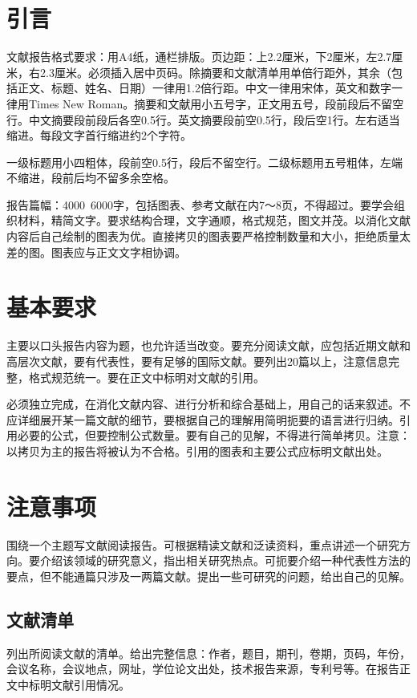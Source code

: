 
\section{引言}
    文献报告格式要求：用A4纸，通栏排版。页边距：上2.2厘米，下2厘米，左2.7厘米，右2.3厘米。必须插入居中页码。除摘要和文献清单用单倍行距外，其余（包括正文、标题、姓名、日期）一律用1.2倍行距。中文一律用宋体，英文和数字一律用Times New Roman。摘要和文献用小五号字，正文用五号，段前段后不留空行。中文摘要段前段后各空0.5行。英文摘要段前空0.5行，段后空1行。左右适当缩进。每段文字首行缩进约2个字符。

    一级标题用小四粗体，段前空0.5行，段后不留空行。二级标题用五号粗体，左端不缩进，段前后均不留多余空格。

    报告篇幅：4000~6000字，包括图表、参考文献在内7～8页，不得超过。要学会组织材料，精简文字。要求结构合理，文字通顺，格式规范，图文并茂。以消化文献内容后自己绘制的图表为优。直接拷贝的图表要严格控制数量和大小，拒绝质量太差的图。图表应与正文文字相协调。

\section{基本要求}
    主要以口头报告内容为题，也允许适当改变。要充分阅读文献，应包括近期文献和高层次文献，要有代表性，要有足够的国际文献。要列出20篇以上，注意信息完整，格式规范统一。要在正文中标明对文献的引用。

    必须独立完成，在消化文献内容、进行分析和综合基础上，用自己的话来叙述。不应详细展开某一篇文献的细节，要根据自己的理解用简明扼要的语言进行归纳。引用必要的公式，但要控制公式数量。要有自己的见解，不得进行简单拷贝。注意：以拷贝为主的报告将被认为不合格。引用的图表和主要公式应标明文献出处。

\section{注意事项}
    围绕一个主题写文献阅读报告。可根据精读文献和泛读资料，重点讲述一个研究方向。要介绍该领域的研究意义，指出相关研究热点。可扼要介绍一种代表性方法的要点，但不能通篇只涉及一两篇文献。提出一些可研究的问题，给出自己的见解。

    \subsection{文献清单}
        列出所阅读文献的清单。给出完整信息：作者，题目，期刊，卷期，页码，年份，会议名称，会议地点，网址，学位论文出处，技术报告来源，专利号等。在报告正文中标明文献引用情况。

